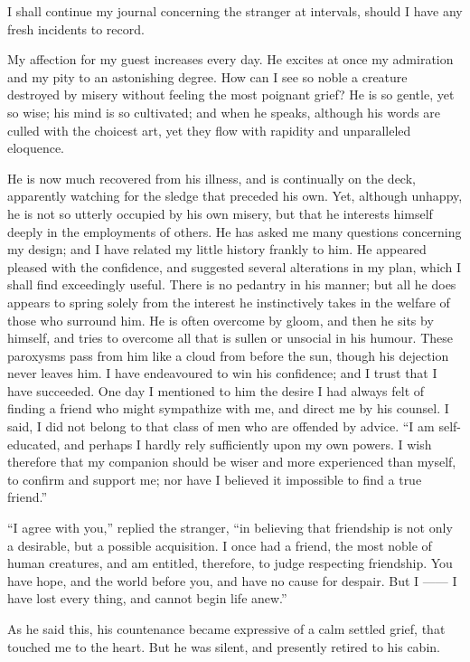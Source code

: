I shall continue my journal concerning
the stranger at intervals, should I
have any fresh incidents to record.


My affection for my guest increases
every day. He excites at once my admiration
and my pity to an astonishing
degree. How can I see so noble a
creature destroyed by misery without
feeling the most poignant grief? He is
so gentle, yet so wise; his mind is so
cultivated; and when he speaks, although
his words are culled with the choicest
art, yet they flow with rapidity and unparalleled
eloquence.

He is now much recovered from his
illness, and is continually on the deck,
apparently watching for the sledge that
preceded his own. Yet, although unhappy,
he is not so utterly occupied by
his own misery, but that he interests
himself deeply in the employments of
others. He has asked me many questions
concerning my design; and I
have related my little history frankly
to him. He appeared pleased with the
confidence, and suggested several alterations
in my plan, which I shall
find exceedingly useful. There is no
pedantry in his manner; but all he
does appears to spring solely from the
interest he instinctively takes in the
welfare of those who surround him. He
is often overcome by gloom, and then
he sits by himself, and tries to overcome
all that is sullen or unsocial in his humour.
These paroxysms pass from him
like a cloud from before the sun,
though his dejection never leaves him.
I have endeavoured to win his confidence;
and I trust that I have succeeded.
One day I mentioned to him
the desire I had always felt of finding
a friend who might sympathize with
me, and direct me by his counsel. I
said, I did not belong to that class of
men who are offended by advice. ``I am
self-educated, and perhaps I hardly rely
sufficiently upon my own powers. I wish
therefore that my companion should
be wiser and more experienced than
myself, to confirm and support me;
nor have I believed it impossible to
find a true friend.''

``I agree with you,'' replied the stranger,
``in believing that friendship is
not only a desirable, but a possible acquisition.
I once had a friend, the
most noble of human creatures, and am
entitled, therefore, to judge respecting
friendship. You have hope, and the
world before you, and have no cause
for despair. But I ------ I have lost
every thing, and cannot begin life
anew.''

As he said this, his countenance became
expressive of a calm settled grief,
that touched me to the heart. But
he was silent, and presently retired to
his cabin.

